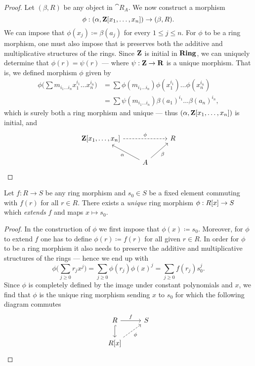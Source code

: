 %
\begin{proof}
Let \((\beta, R)\) be any object in \(\cat R_A\). We now construct a morphism
\[
\phi: (\alpha, \mathbf{Z}[x_1, \dots, x_n]) \to (\beta, R).
\]
We can impose that \(\phi(x_j) \coloneq \beta(a_j)\) for every
\(1 \leq j \leq n\). For \(\phi\) to be a ring morphism, one must also impose
that is preserves both the additive and multiplicative structures of the
rings. Since \(\mathbf{Z}\) is initial in \({\textbf{Ring}}\), we can uniquely determine that
\(\phi(r) = \psi(r)\) --- where \(\psi: \mathbf{Z} \to \mathbf{R}\) is a unique
morphism. That is, we defined morphism \(\phi\) given by
\begin{align*}
  \phi\bigg( \sum m_{i_1 \dots i_n} x_1^{i_1} \dots x_n^{i_n} \bigg)
  &= \sum \phi(m_{i_1 \dots i_n}) \phi(x_1^{i_1}) \dots \phi(x_n^{i_n}) \\
  &= \sum \psi(m_{i_1 \dots i_n}) \beta(a_1)^{i_1} \dots \beta(a_n)^{i_n},
\end{align*}
which is surely both a ring morphism and unique --- thus \((\alpha, \mathbf{Z}[x_1,
\dots, x_n])\) is initial, and
\[
\begin{tikzcd}
\Z[x_1, \dots, x_n] \ar[rr, dashed, "\phi"] & &R \\
&A \ar[lu, "\alpha"] \ar[ru, swap, "\beta"]   &
\end{tikzcd}
\]
\end{proof}
%

%
\begin{proposition}
\label{prop:universal-property-polynomial-rings}
Let \(f: R \to S\) be any ring morphism and \(s_0 \in S\) be a fixed element
commuting with \(f(r)\) for all \(r \in R\). There exists a \emph{unique} ring
morphism \(\phi: R[x] \to S\) which \emph{extends} \(f\) and maps
\(x \mapsto s_0\).
\end{proposition}
%

%
\begin{proof}
In the construction of \(\phi\) we first impose that \(\phi(x) \coloneq
s_0\). Moreover, for \(\phi\) to extend \(f\) one has to define \(\phi(r)
\coloneq f(r)\) for all given \(r \in R\). In order for \(\phi\) to be a ring
morphism it also needs to preserve the additive and multiplicative structures of
the rings --- hence we end up with
\[
\phi\bigg( \sum_{j \geq 0} r_j x^j \bigg)
= \sum_{j \geq 0} \phi(r_j) \phi(x)^j
= \sum_{j \geq 0} f(r_j) s_0^j.
\]
Since \(\phi\) is completely defined by the image under constant polynomials and
\(x\), we find that \(\phi\) is the unique ring morphism sending \(x\) to
\(s_0\) for which the following diagram commutes
\[
\begin{tikzcd}
R \ar[d, hook] \ar[r, "f"]         & S \\
R[x] \ar[ru, dashed, swap, "\phi"] &
\end{tikzcd}
\]
\end{proof}
%

